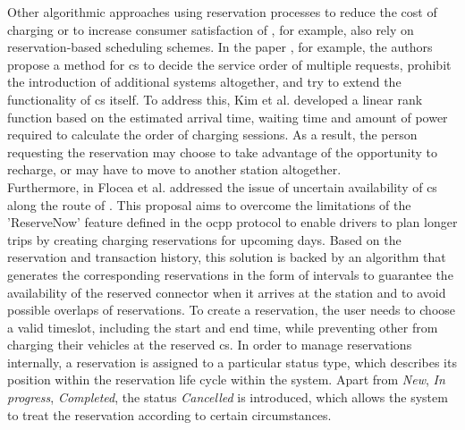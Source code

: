 \noindent Other algorithmic approaches using reservation processes to reduce the cost of charging or to increase consumer satisfaction of , for example, also rely on reservation-based scheduling schemes.
In the paper \cite{kim_efficient_2010}, for example, the authors propose a method for \acrshort{cs} to decide the service order of multiple requests, prohibit the introduction of additional systems altogether, and try to extend the functionality of \acrshort{cs} itself. 
To address this, Kim et al. developed a linear rank function based on the estimated arrival time, waiting time and amount of power required to calculate the order of charging sessions.
As a result, the person requesting the reservation may choose to take advantage of the opportunity to recharge, or may have to move to another station altogether. \\
\noindent Furthermore, in \cite{flocea_electric_2022} Flocea et al. addressed the issue of uncertain availability of \acrshort{cs} along the route of . 
This proposal aims to overcome the limitations of the 'ReserveNow' feature defined in the \acrshort{ocpp} protocol to enable drivers to plan longer trips by creating charging reservations for upcoming days.
Based on the  reservation and transaction history, this solution is backed by an algorithm that generates the corresponding reservations in the form of intervals to guarantee the availability of the reserved connector when it arrives at the station and to avoid possible overlaps of reservations.
To create a reservation, the user needs to choose a valid timeslot, including the start and end time, while preventing other  from charging their vehicles at the reserved \acrshort{cs}.
In order to manage reservations internally, a reservation is assigned to a particular status type, which describes its position within the reservation life cycle within the system. 
Apart from \textit{New}, \textit{In progress}, \textit{Completed}, the status \textit{Cancelled} is introduced, which allows the system to treat the reservation according to certain circumstances.
